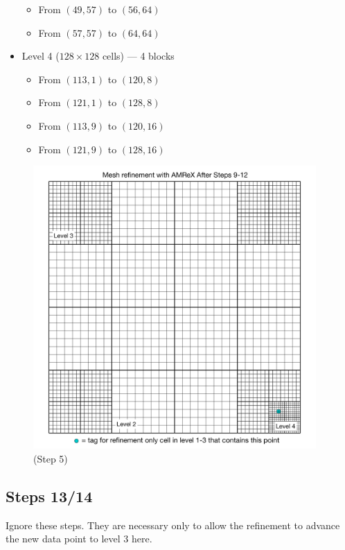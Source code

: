 \documentclass[12pt,letterpaper]{article}
\begin{document}
\begin{itemize}
\begin{itemize}
    \item{From $(49,57)$ to $(56,64)$}
    \item{From $(57,57)$ to $(64,64)$}
    \end{itemize}
\item{Level 4 ($128 \times 128$ cells) --- 4 blocks}
    \begin{itemize}
    \item{From $(113,1)$ to $(120, 8)$}
    \item{From $(121,1)$ to $(128, 8)$}
    \item{From $(113,9)$ to $(120,16)$}
    \item{From $(121,9)$ to $(128,16)$}
    \end{itemize}
\end{itemize}

\begin{figure}[!hp]
\begin{center}
\includegraphics[width=4.25in]{TestRefine_Step10_Both.pdf}
\caption{(Step 5) }
\end{center}
\end{figure}

\newpage
\subsection{Steps 13/14}
Ignore these steps.  They are necessary only to allow the refinement to advance
the new data point to level 3 here.

\newpage
\end{document}
